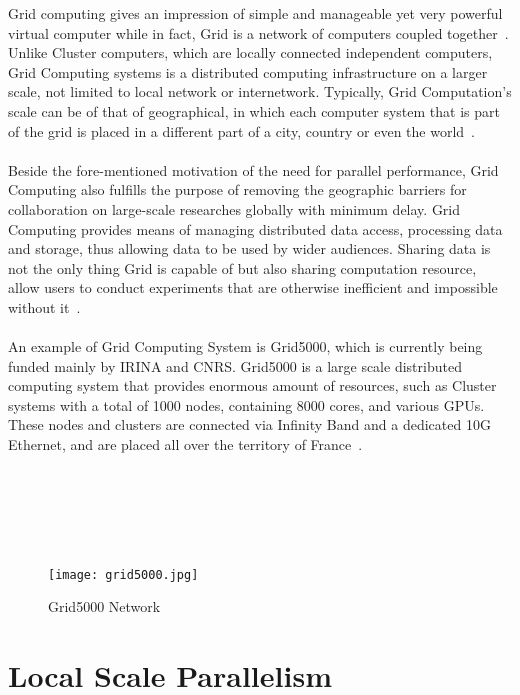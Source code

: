 Grid computing gives an impression of simple and manageable yet very powerful virtual computer while in fact, Grid is a network of computers coupled together~\cite{redbook}. Unlike Cluster computers, which are locally connected independent computers, Grid Computing systems is a distributed computing infrastructure on a larger scale, not limited to local network or internetwork. Typically, Grid Computation's scale can be of that of geographical, in which each computer system that is part of the grid is placed in a different part of a city, country or even the world~\cite{grid_tech}. \\
~\\
Beside the fore-mentioned motivation of the need for parallel performance, Grid Computing also fulfills the purpose of removing the geographic barriers for collaboration on large-scale researches globally with minimum delay. Grid Computing provides means of managing distributed data access, processing data and storage, thus allowing data to be used by wider audiences. Sharing data is not the only thing Grid is capable of but also sharing computation resource, allow users to conduct experiments that are otherwise inefficient and impossible without it~\cite{intro_grid}. \\
~\\
An example of Grid Computing System is Grid5000, which is currently being funded mainly by IRINA and CNRS. Grid5000 is a large scale distributed computing system that provides enormous amount of resources, such as Cluster systems with a total of 1000 nodes, containing 8000 cores, and various GPUs. These nodes and clusters are connected via Infinity Band and a dedicated 10G Ethernet, and are placed all over the territory of France~\cite{grid5000}. \\
~\\
~\\
~\\
~\\
~\\
\begin{figure}[H]
\texttt{[image: grid5000.jpg]}
\centering
\caption{Grid5000 Network~\cite{grid5000img}}
\end{figure}

\section{Local Scale Parallelism}

